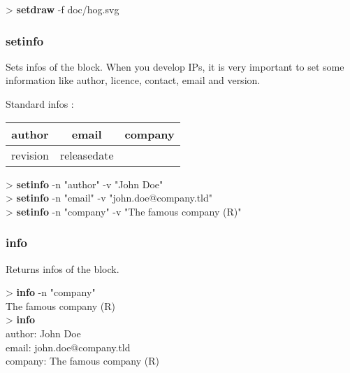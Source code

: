 \documentclass[10pt,a4paper]{article}
\begin{document}
\begin{sampletitle}[2]
> \textbf{\tool{} setdraw} -f doc/hog.svg
\end{sampletitle}

\subsubsection{setinfo}

Sets infos of the block. When you develop IPs, it is very important to set some information like author, licence, contact, email and version. \\


Standard infos :

\begin{tabular}{|c|c|c|}
\hline 
author & email & company \\ 
\hline 
revision & releasedate &  \\ 
\hline 
\end{tabular} 

\begin{sampletitle}
> \textbf{\tool{} setinfo} -n "author"  -v "John Doe"\\
> \textbf{\tool{} setinfo} -n "email"  -v "john.doe@company.tld"\\
> \textbf{\tool{} setinfo} -n "company"  -v "The famous company (R)"
\end{sampletitle}

\subsubsection{info}

Returns infos of the block. \\


\begin{sampletitle}
> \textbf{\tool{} info} -n "company"\\The famous company (R)\\
> \textbf{\tool{} info}\\
author: John Doe\\
email: john.doe@company.tld\\
company: The famous company (R)
\end{sampletitle}
\end{document}
